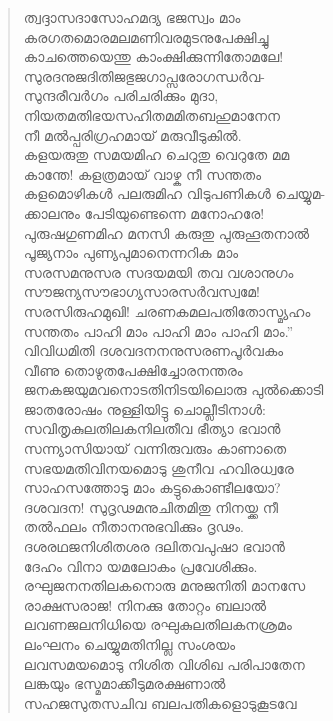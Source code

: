 \begin{verse}
ത്വദ്ദാസദാസോഹമദ്യ ഭജസ്വം മാം\\
കരഗതമൊരമലമണിവരമുടനുപേക്ഷിച്ചു\\
കാചത്തെയെന്തു കാംക്ഷിക്കുന്നിതോമലേ!\\
സുരദനുജദിതിജഭുജഗാപ്സരോഗന്ധര്‍വ-\\
സുന്ദരീവര്‍ഗം പരിചരിക്കും മുദാ,\\
നിയതമതിഭയസഹിതമമിതബഹുമാനേന\\
നീ മല്‍പ്പരിഗ്രഹമായ് മരുവീടുകില്‍.\\
കളയരുതു സമയമിഹ ചെറുതു വെറുതേ മമ\\
കാന്തേ! കളത്രമായ് വാഴ്ക നീ സന്തതം\\
കളമൊഴികള്‍ പലരുമിഹ വിടുപണികള്‍ ചെയ്യുമ-\\
ക്കാലനും പേടിയുണ്ടെന്നെ മനോഹരേ!\\
പുരുഷഗുണമിഹ മനസി കരുതു പുരുഹൂതനാല്‍\\
പൂജ്യനാം പുണ്യപുമാനെന്നറിക മാം\\
സരസമനുസര സദയമയി തവ വശാനുഗം\\
സൗജന്യസൗഭാഗ്യസാരസര്‍വസ്വമേ!\\
സരസിരുഹമുഖി! ചരണകമലപതിതോസ്മ്യഹം\\
സന്തതം പാഹി മാം പാഹി മാം പാഹി മാം.”\\
വിവിധമിതി ദശവദനനനുസരണപൂര്‍വകം\\
വീണു തൊഴുതപേക്ഷിച്ചോരനന്തരം\\
ജനകജയുമവനൊടതിനിടയിലൊരു പുല്‍ക്കൊടി\\
ജാതരോഷം നുള്ളിയിട്ടു ചൊല്ലീടിനാള്‍:\\
സവിതൃകുലതിലകനിലതീവ ഭീത്യാ ഭവാന്‍\\
സന്ന്യാസിയായ് വന്നിരുവരും കാണാതെ\\
സഭയമതിവിനയമൊടു ശുനീവ ഹവിരധ്വരേ\\
സാഹസത്തോടു മാം കട്ടുകൊണ്ടീലയോ?\\
ദശവദന! സുദൃഢമനുചിതമിതു നിനയ്ക്ക നീ\\
തല്‍ഫലം നീതാനനുഭവിക്കും ദൃഢം.\\
ദശരഥജനിശിതശര ദലിതവപുഷാ ഭവാന്‍\\
ദേഹം വിനാ യമലോകം പ്രവേശിക്കും.\\
രഘുജനനതിലകനൊരു മനുജനിതി മാനസേ\\
രാക്ഷസരാജ! നിനക്കു തോറ്റം ബലാല്‍\\
ലവണജലനിധിയെ രഘുകുലതിലകനശ്രമം\\
ലംഘനം ചെയ്യുമതിനില്ല സംശയം\\
ലവസമയമൊടു നിശിത വിശിഖ പരിപാതേന\\
ലങ്കയും ഭസ്മമാക്കീടുമരക്ഷണാല്‍\\
സഹജസുതസചിവ ബലപതികളൊടുകൂടവേ\\

\end{verse}
